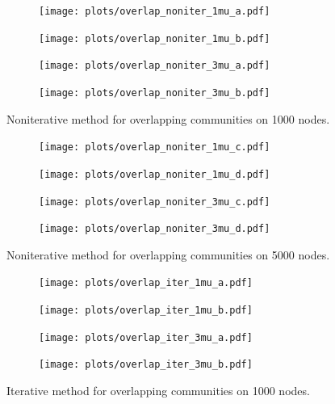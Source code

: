 \begin{figure}
    \centering
    \begin{subfigure}{0.5\textwidth}
    \texttt{[image: plots/overlap\_noniter\_1mu\_a.pdf]}
    \end{subfigure}%
    \begin{subfigure}{0.5\textwidth}
    \texttt{[image: plots/overlap\_noniter\_1mu\_b.pdf]}
    \end{subfigure}
    \begin{subfigure}{0.5\textwidth}
    \texttt{[image: plots/overlap\_noniter\_3mu\_a.pdf]}
    \end{subfigure}%
    \begin{subfigure}{0.5\textwidth}
    \texttt{[image: plots/overlap\_noniter\_3mu\_b.pdf]}
    \end{subfigure}
    \label{fig:no_iter_overlap_1000N}
    \caption{Noniterative method for overlapping communities on 1000 nodes.}
\end{figure}

\begin{figure}
    \centering
    \begin{subfigure}{0.5\textwidth}
    \texttt{[image: plots/overlap\_noniter\_1mu\_c.pdf]}
    \end{subfigure}%
    \begin{subfigure}{0.5\textwidth}
    \texttt{[image: plots/overlap\_noniter\_1mu\_d.pdf]}
    \end{subfigure}
    \begin{subfigure}{0.5\textwidth}
    \texttt{[image: plots/overlap\_noniter\_3mu\_c.pdf]}
    \end{subfigure}%
    \begin{subfigure}{0.5\textwidth}
    \texttt{[image: plots/overlap\_noniter\_3mu\_d.pdf]}
    \end{subfigure}
    \label{fig:no_iter_overlap_5000N}
    \caption{Noniterative method for overlapping communities on 5000 nodes.}
\end{figure}


\begin{figure}
    \centering
    \begin{subfigure}{0.5\textwidth}
    \texttt{[image: plots/overlap\_iter\_1mu\_a.pdf]}
    \end{subfigure}%
    \begin{subfigure}{0.5\textwidth}
    \texttt{[image: plots/overlap\_iter\_1mu\_b.pdf]}
    \end{subfigure}
    \begin{subfigure}{0.5\textwidth}
    \texttt{[image: plots/overlap\_iter\_3mu\_a.pdf]}
    \end{subfigure}%
    \begin{subfigure}{0.5\textwidth}
    \texttt{[image: plots/overlap\_iter\_3mu\_b.pdf]}
    \end{subfigure}
    \label{fig:iter_overlap_1000N}
    \caption{Iterative method for overlapping communities on 1000 nodes.}
\end{figure}

